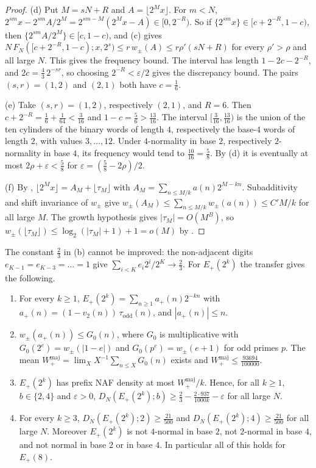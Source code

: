 \documentclass[11pt]{article}
\newcommand{\wpm}{w_{\pm}}
\begin{document}
\begin{proof}
(d) Put $M=sN+R$ and $A=\lfloor2^Mx\rfloor$. For $m<N$, $2^{sm}x-2^{sm}A/2^M=2^{sm-M}(2^Mx-A)\in[0,2^{-R})$. So if $\{2^{sm}x\}\in[c+2^{-R},1-c)$, then $\{2^{sm}A/2^M\}\in[c,1-c)$, and (c) gives $N\,F_N([c+2^{-R},1-c);x,2^s)\le r\,\wpm(A)\le r\rho'(sN+R)$ for every $\rho'>\rho$ and all large $N$. This gives the frequency bound. The interval has length $1-2c-2^{-R}$, and $2c=\frac43\,2^{-sr}$, so choosing $2^{-R}<\varepsilon/2$ gives the discrepancy bound. The pairs $(s,r)=(1,2)$ and $(2,1)$ both have $c=\frac16$.

(e) Take $(s,r)=(1,2)$, respectively $(2,1)$, and $R=6$. Then $c+2^{-R}=\frac16+\frac1{64}<\frac3{16}$ and $1-c=\frac56>\frac{13}{16}$. The interval $[\frac3{16},\frac{13}{16})$ is the union of the ten cylinders of the binary words of length $4$, respectively the base-$4$ words of length $2$, with values $3,\dots,12$. Under $4$-normality in base $2$, respectively $2$-normality in base $4$, its frequency would tend to $\frac{10}{16}=\frac58$. By (d) it is eventually at most $2\rho+\varepsilon<\frac58$ for $\varepsilon=(\frac58-2\rho)/2$.

(f) By , $\lfloor2^Mx\rfloor=A_M+\lfloor\tau_M\rfloor$ with $A_M=\sum_{n\le M/k}a(n)2^{M-kn}$. Subadditivity and shift invariance of $\wpm$ give $\wpm(A_M)\le\sum_{n\le M/k}\wpm(a(n))\le C'M/k$ for all large $M$. The growth hypothesis gives $|\tau_M|=O(M^B)$, so $\wpm(\lfloor\tau_M\rfloor)\le\log_2(|\tau_M|+1)+1=o(M)$ by .
\end{proof}

The constant $\frac23$ in (b) cannot be improved: the non-adjacent digits $e_{K-1}=e_{K-3}=\dots=1$ give $\sum_{i<K}e_i2^i/2^K\to\frac23$. For $E_+(2^k)$ the transfer gives the following.

\begin{theorem}\label{thm:Eplus-lean}
\begin{enumerate}[label=\textup{(\arabic*)},nosep]
\item For every $k\ge1$, $E_+(2^k)=\sum_{n\ge1}a_+(n)2^{-kn}$ with $a_+(n)=(1-v_2(n))\,\tau_{\mathrm{odd}}(n)$, and $|a_+(n)|\le n$.
\item $\wpm(a_+(n))\le G_0(n)$, where $G_0$ is multiplicative with $G_0(2^e)=\wpm(|1-e|)$ and $G_0(p^e)=\wpm(e+1)$ for odd primes $p$. The mean $W_+^{\mathrm{maj}}=\lim_XX^{-1}\sum_{n\le X}G_0(n)$ exists and $W_+^{\mathrm{maj}}\le\frac{93694}{100000}$.
\item $E_+(2^k)$ has prefix NAF density at most $W_+^{\mathrm{maj}}/k$. Hence, for all $k\ge1$, $b\in\{2,4\}$ and $\varepsilon>0$, $D_N(E_+(2^k);b)\ge\frac23-\frac{2\cdot937}{1000k}-\varepsilon$ for all large $N$.
\item For every $k\ge3$, $D_N(E_+(2^k);2)\ge\frac{21}{500}$ and $D_N(E_+(2^k);4)\ge\frac{21}{500}$ for all large $N$. Moreover $E_+(2^k)$ is not $4$-normal in base $2$, not $2$-normal in base $4$, and not normal in base $2$ or in base $4$. In particular all of this holds for $E_+(8)$.
\end{enumerate}
\end{theorem}
\end{document}
